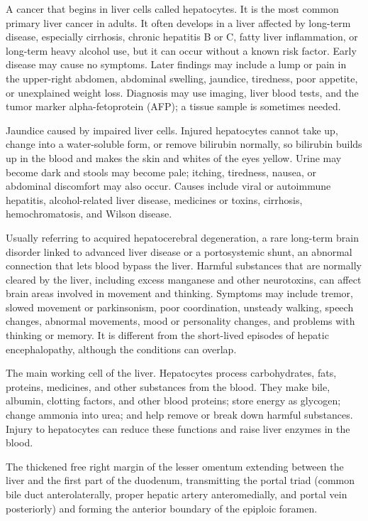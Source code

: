  A cancer that begins in liver cells called hepatocytes. It is the most common primary liver cancer in adults. It often develops in a liver affected by long-term disease, especially cirrhosis, chronic hepatitis B or C, fatty liver inflammation, or long-term heavy alcohol use, but it can occur without a known risk factor. Early disease may cause no symptoms. Later findings may include a lump or pain in the upper-right abdomen, abdominal swelling, jaundice, tiredness, poor appetite, or unexplained weight loss. Diagnosis may use imaging, liver blood tests, and the tumor marker alpha-fetoprotein (AFP); a tissue sample is sometimes needed.

 Jaundice caused by impaired liver cells. Injured hepatocytes cannot take up, change into a water-soluble form, or remove bilirubin normally, so bilirubin builds up in the blood and makes the skin and whites of the eyes yellow. Urine may become dark and stools may become pale; itching, tiredness, nausea, or abdominal discomfort may also occur. Causes include viral or autoimmune hepatitis, alcohol-related liver disease, medicines or toxins, cirrhosis, hemochromatosis, and Wilson disease.

 Usually referring to acquired hepatocerebral degeneration, a rare long-term brain disorder linked to advanced liver disease or a portosystemic shunt, an abnormal connection that lets blood bypass the liver. Harmful substances that are normally cleared by the liver, including excess manganese and other neurotoxins, can affect brain areas involved in movement and thinking. Symptoms may include tremor, slowed movement or parkinsonism, poor coordination, unsteady walking, speech changes, abnormal movements, mood or personality changes, and problems with thinking or memory. It is different from the short-lived episodes of hepatic encephalopathy, although the conditions can overlap.

 The main working cell of the liver. Hepatocytes process carbohydrates, fats, proteins, medicines, and other substances from the blood. They make bile, albumin, clotting factors, and other blood proteins; store energy as glycogen; change ammonia into urea; and help remove or break down harmful substances. Injury to hepatocytes can reduce these functions and raise liver enzymes in the blood.

 The thickened free right margin of the lesser omentum extending between the liver and the first part of the duodenum, transmitting the portal triad (common bile duct anterolaterally, proper hepatic artery anteromedially, and portal vein posteriorly) and forming the anterior boundary of the epiploic foramen.

